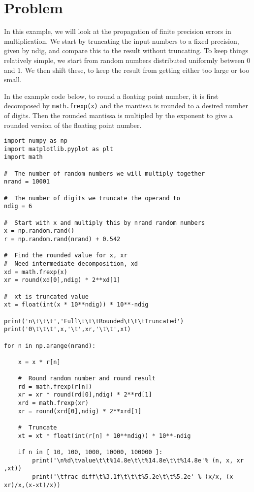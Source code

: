 \section{Problem \thesection}\label{sec:q1}

In this example, we will look at the propagation of finite precision errors in
multiplication. We start by truncating the input numbers to a fixed precision, given by
ndig, and compare this to the result without truncating. To keep things relatively simple,
we start from random numbers distributed uniformly between $0$ and $1$. We then shift these,
to keep the result from getting either too large or too small.

In the example code below, to round a floating point number, it is first decomposed by
\texttt{math.frexp(x)} and the mantissa is rounded to a desired number of digits. Then the
rounded mantissa is multipled by the exponent to give a rounded version of the floating
point number.

\begin{verbatim}
import numpy as np
import matplotlib.pyplot as plt
import math

#  The number of random numbers we will multiply together
nrand = 10001

#  The number of digits we truncate the operand to
ndig = 6

#  Start with x and multiply this by nrand random numbers
x = np.random.rand()
r = np.random.rand(nrand) + 0.542

#  Find the rounded value for x, xr
#  Need intermediate decomposition, xd
xd = math.frexp(x)
xr = round(xd[0],ndig) * 2**xd[1]

#  xt is truncated value
xt = float(int(x * 10**ndig)) * 10**-ndig

print('n\t\t\t','Full\t\t\tRounded\t\t\tTruncated')
print('0\t\t\t',x,'\t',xr,'\t\t',xt)

for n in np.arange(nrand):

    x = x * r[n]

    #  Round random number and round result
    rd = math.frexp(r[n])
    xr = xr * round(rd[0],ndig) * 2**rd[1]
    xrd = math.frexp(xr)
    xr = round(xrd[0],ndig) * 2**xrd[1]

    #  Truncate
    xt = xt * float(int(r[n] * 10**ndig)) * 10**-ndig

    if n in [ 10, 100, 1000, 10000, 100000 ]:
        print('\n%d\tvalue\t\t%14.8e\t\t%14.8e\t\t%14.8e'% (n, x, xr ,xt))
        print('\tfrac diff\t%3.1f\t\t\t%5.2e\t\t%5.2e' % (x/x, (x-xr)/x,(x-xt)/x))
\end{verbatim}

